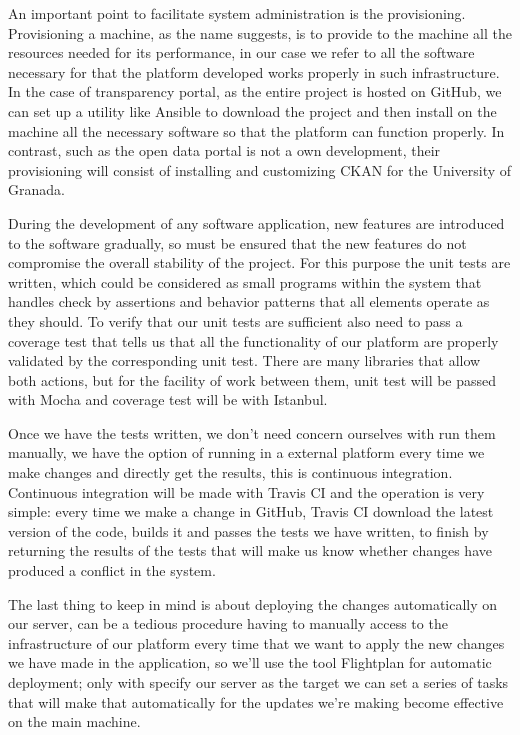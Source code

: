 {\bigskip
An important point to facilitate system administration is the provisioning. Provisioning a machine, as the name suggests, is to
provide to the machine all the resources needed for its performance, in our case we refer to all the software necessary for
that the platform developed works properly in such infrastructure. In the case of transparency portal, as the entire project
is hosted on GitHub, we can set up a utility like Ansible to download the project and then install on the machine all the
necessary software so that the platform can function properly. In contrast, such as the open data portal is not a own
development, their provisioning will consist of installing and customizing CKAN for the University of Granada.

\bigskip
During the development of any software application, new features are introduced to the software gradually, so must be ensured
that the new features do not compromise the overall stability of the project. For this purpose the unit tests are written, 
which could be considered as small programs within the system that handles check by assertions and behavior patterns that all
elements operate as they should. To verify that our unit tests are sufficient also need to pass a coverage test that tells us
that all the functionality of our platform are properly validated by the corresponding unit test. There are many libraries that
allow both actions, but for the facility of work between them, unit test will be passed with Mocha and coverage test will be
with Istanbul.

\bigskip
Once we have the tests written, we don't need concern ourselves with run them manually, we have the option of running in a
external platform every time we make changes and directly get the results, this is continuous integration. Continuous
integration will be made with Travis CI and the operation is very simple: every time we make a change in GitHub, Travis CI
download the latest version of the code, builds it and passes the tests we have written, to finish by returning the results
of the tests that will make us know whether changes have produced a conflict in the system. 

\bigskip
The last thing to keep in mind is about deploying the changes automatically on our server, can be a tedious procedure having to
manually access to the infrastructure of our platform every time that we want to apply the new changes we have made in the
application, so we'll use the tool Flightplan for automatic deployment; only with specify our server as the target we can set
a series of tasks that will make that automatically for the updates we're making become effective on the main machine.

}
